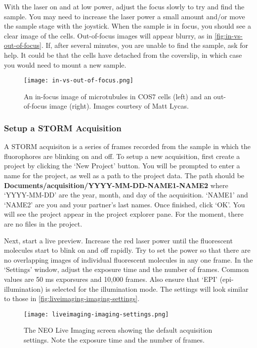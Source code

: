 \documentclass[10pt,a4paper,oneside]{book}
\begin{document}
With the laser on and at low power, adjust the focus slowly to try and find the sample. You may need to increase the laser power a small amount and/or move the sample stage with the joystick. When the sample is in focus, you should see a clear image of the cells. Out-of-focus images will appear blurry, as in \autoref{fig:in-vs-out-of-focus}. If, after several minutes, you are unable to find the sample, ask for help. It could be that the cells have detached from the coverslip, in which case you would need to mount a new sample.

\begin{figure}[ht]
    \centering
    \texttt{[image: in-vs-out-of-focus.png]}
    \caption{An in-focus image of microtubules in COS7 cells (left) and an out-of-focus image (right). Images courtesy of Matt Lycas.}
    \label{fig:in-vs-out-of-focus}
\end{figure}

\subsubsection{Setup a STORM Acquisition}

A STORM acquisiton is a series of frames recorded from the sample in which the fluorophores are blinking on and off. To setup a new acquisition, first create a project by clicking the `New Project' button. You will be prompted to enter a name for the project, as well as a path to the project data. The path should be \textbf{Documents/acquisition/YYYY-MM-DD-NAME1-NAME2} where `YYYY-MM-DD' are the year, month, and day of the acquisition. `NAME1' and `NAME2' are you and your partner's last names. Once finished, click `OK'. You will see the project appear in the project explorer pane. For the moment, there are no files in the project.

Next, start a live preview. Increase the red laser power until the fluorescent molecules start to blink on and off rapidly. Try to set the power so that there are no overlapping images of individual fluorescent molecules in any one frame. In the `Settings' window, adjust the exposure time and the number of frames. Common values are 50 ms exporsures and 10,000 frames. Also ensure that `EPI' (epi-illumination) is selected for the illumination mode. The settings will look similar to those in \autoref{fig:liveimaging-imaging-settings}.

\begin{figure}[ht]
    \centering
    \texttt{[image: liveimaging-imaging-settings.png]}
    \caption{The NEO Live Imaging screen showing the default acquisition settings. Note the exposure time and the number of frames.}
    \label{fig:liveimaging-imaging-settings}
\end{figure}
\end{document}

